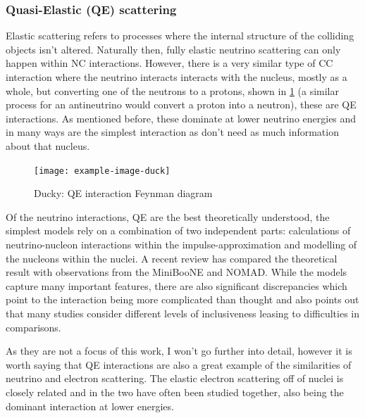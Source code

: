 \documentclass[a4paper,12pt]{article}
\begin{document}
\subsubsection{Quasi-Elastic (QE) scattering}
Elastic scattering refers to processes where the internal structure of the colliding objects isn't altered.
Naturally then, fully elastic neutrino scattering can only happen within NC interactions.
However, there is a very similar type of CC interaction where the neutrino interacts interacts with the nucleus, mostly as a whole, but converting one of the neutrons to a protons, shown in \cref{fig:QE_fd} (a similar process for an antineutrino would convert a proton into a neutron), these are QE interactions.
As mentioned before, these dominate at lower neutrino energies and in many ways are the simplest interaction as don't need as much information about that nucleus.

\begin{figure}[h]
\centering
    \texttt{[image: example-image-duck]}
    \caption{
        Ducky: QE interaction Feynman diagram
    }\label{fig:QE_fd}
\end{figure}

Of the neutrino interactions, QE are the best theoretically understood, the simplest models rely on a combination of two independent parts: calculations of neutrino-nucleon interactions within the impulse-approximation and modelling of the nucleons within the nuclei.
A recent review \cite{gallagherNeutrinoNucleusInteractions2011} has compared the theoretical result with observations from the MiniBooNE and NOMAD.
While the models capture many important features, there are also significant discrepancies which point to the interaction being more complicated than thought and also points out that many studies consider different levels of inclusiveness leasing to difficulties in comparisons.


As they are not a focus of this work, I won't go further into detail, however it is worth saying that QE interactions are also a great example of the similarities of neutrino and electron scattering.
The elastic electron scattering off of nuclei is closely related and in the two have often been studied together, also being the dominant interaction at lower energies.
\end{document}
